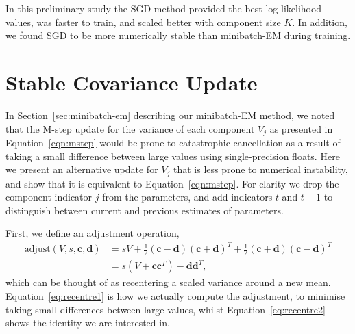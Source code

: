 \documentclass{article}
\newcommand{\bc}{\mathbf{c}}
\newcommand{\bd}{\mathbf{d}}
\begin{document}
In this preliminary study the SGD method provided the best log-likelihood values, was faster to train, and scaled better with component size $K$.
In addition, we found SGD to be more numerically stable than minibatch-EM during training.



\appendix

\section{Stable Covariance Update}
\label{apx:variance-rewrite}

In Section~\ref{sec:minibatch-em} describing our minibatch-EM method, we noted that the M-step update for the variance of each component $V_j$ as presented in Equation~\ref{eqn:mstep} would be prone to catastrophic cancellation as a result of taking a small difference between large values using single-precision floats.
Here we present an alternative update for $V_j$ that is less prone to numerical instability, and show that it is equivalent to Equation~\ref{eqn:mstep}.
For clarity we drop the component indicator $j$ from the parameters, and add indicators $t$ and $t-1$ to distinguish between current and previous estimates of parameters.

First, we define an adjustment operation,
\begin{align}
  \text{adjust}(V, s, \bc, \bd) &= sV + \frac{1}{2}(\bc - \bd)(\bc + \bd)^T + \frac{1}{2}(\bc + \bd)(\bc - \bd)^T  \label{eq:recentre1} \\
  &= s(V + \bc\bc^T) - \bd\bd^T,\label{eq:recentre2}
\end{align}
which can be thought of as recentering a scaled variance around a new mean.
Equation~\ref{eq:recentre1} is how we actually compute the adjustment, to minimise taking small differences between large values, whilst Equation~\ref{eq:recentre2} shows the identity we are interested in.
\end{document}

